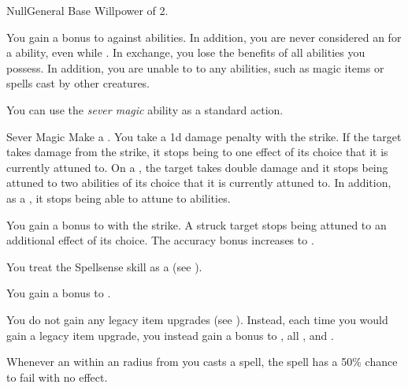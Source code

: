     \begin{feat}{Null}{General}
        \featpre Base Willpower of 2.

         You gain a  bonus to  against  abilities.
        In addition, you are never considered an  for a  ability, even while \unconscious.
        In exchange, you lose the benefits of all  abilities you possess.
        In addition, you are unable to  to any  abilities, such as magic items or spells cast by other creatures.

         You can use the \textit{sever magic} ability as a standard action.
        \begin{freeability}{Sever Magic}
            Make a .
            You take a \minus1d damage penalty with the strike.
            If the target takes damage from the strike, it stops being  to one effect of its choice that it is currently attuned to.
            On a , the target takes double damage and it stops being attuned to two abilities of its choice that it is currently attuned to.
            In addition, as a , it stops being able to attune to abilities.

            \rankline
             You gain a  bonus to  with the strike.
             A struck target stops being attuned to an additional effect of its choice.
             The accuracy bonus increases to .
        \end{freeability}

         You treat the Spellsense skill as a  (see ).

         You gain a  bonus to .

         You do not gain any legacy item upgrades (see ).
        Instead, each time you would gain a legacy item upgrade, you instead gain a  bonus to , all , and .

         Whenever an  within an \areamed radius from you casts a spell, the spell has a 50\% chance to fail with no effect.


\end{feat}
